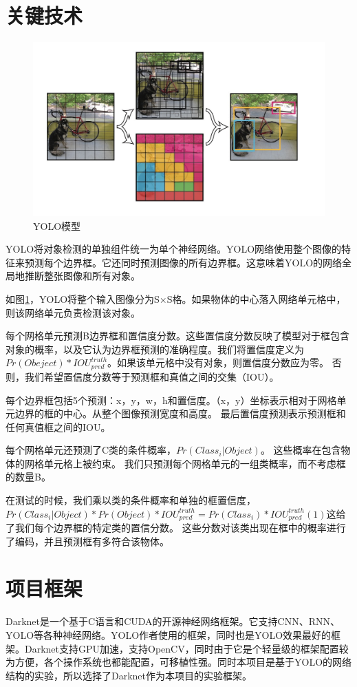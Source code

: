 \section{关键技术}{
	\begin{figure}[htbp]
	\centering
	\includegraphics[width=5in]{images/YOLOMX.png}
	\caption{YOLO模型}
	\label{YOLOMX}
	\end{figure}
	YOLO将对象检测的单独组件统一为单个神经网络。YOLO网络使用整个图像的特征来预测每个边界框。它还同时预测图像的所有边界框。这意味着YOLO的网络全局地推断整张图像和所有对象。

	如图\ref{YOLOMX}，YOLO将整个输入图像分为S×S格。如果物体的中心落入网络单元格中，则该网络单元负责检测该对象。

	每个网格单元预测B边界框和置信度分数。这些置信度分数反映了模型对于框包含对象的概率，以及它认为边界框预测的准确程度。我们将置信度定义为$Pr(Obeject)*IOU_{pred}^{truth}$。如果该单元格中没有对象，则置信度分数应为零。 否则，我们希望置信度分数等于预测框和真值之间的交集（IOU）。

	每个边界框包括5个预测：x，y，w，h和置信度。（x，y）坐标表示相对于网格单元边界的框的中心。从整个图像预测宽度和高度。 最后置信度预测表示预测框和任何真值框之间的IOU。

	每个网格单元还预测了C类的条件概率，$Pr(Class_i|Object)$。 这些概率在包含物体的网格单元格上被约束。 我们只预测每个网格单元的一组类概率，而不考虑框的数量B。

	在测试的时候，我们乘以类的条件概率和单独的框置信度，$Pr(Class_i|Object)*Pr(Object)*IOU_{pred}^{truth}=Pr(Class_i)*IOU_{pred}^{truth} (1)$这给了我们每个边界框的特定类的置信分数。 这些分数对该类出现在框中的概率进行了编码，并且预测框有多符合该物体。
}

\section{项目框架}{
	Darknet\cite{darknet}是一个基于C语言和CUDA的开源神经网络框架。它支持CNN、RNN、YOLO等各种神经网络。YOLO作者使用的框架，同时也是YOLO效果最好的框架。Darknet支持GPU加速，支持OpenCV，同时由于它是个轻量级的框架配置较为方便，各个操作系统也都能配置，可移植性强。同时本项目是基于YOLO的网络结构的实验，所以选择了Darknet作为本项目的实验框架。
}

